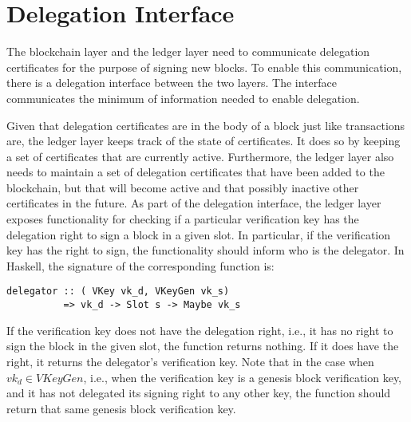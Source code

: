 \documentclass[11pt,a4paper]{article}
\begin{document}



\section{Delegation Interface}
\label{sec:del-interface}

The blockchain layer and the ledger layer need to communicate delegation
certificates for the purpose of signing new blocks.
%
To enable this communication, there is a delegation interface between the two
layers.
%
The interface communicates the minimum of information needed to enable
delegation.


Given that delegation certificates are in the body of a block just like
transactions are, the ledger layer keeps track of the state of certificates.
%
It does so by keeping a set of certificates that are currently active.
%
Furthermore, the ledger layer also needs to maintain a set of delegation
certificates that have been added to the blockchain, but that will become
active and that possibly inactive other certificates in the future.
%
As part of the delegation interface, the ledger layer exposes functionality
for checking if a particular verification key has the delegation right to sign
a block in a given slot.
%
In particular, if the verification key has the right to sign, the
functionality should inform who is the delegator.
%
In Haskell, the signature of the corresponding function is:
%
\begin{lstlisting}
delegator :: ( VKey vk_d, VKeyGen vk_s)
          => vk_d -> Slot s -> Maybe vk_s
\end{lstlisting}

If the verification key does not have the delegation right, i.e., it has no
right to sign the block in the given slot, the function returns nothing.
%
If it does have the right, it returns the delegator's verification key.
%
Note that in the case when $vk_d \in VKeyGen$, i.e., when the verification key
is a genesis block verification key, and it has not delegated its signing
right to any other key, the function should return that same genesis block
verification key.
\end{document}
